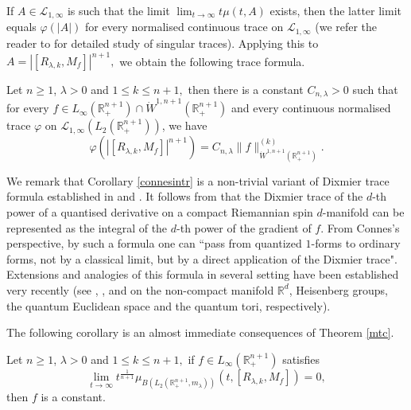 \documentclass[12pt]{amsart}
\begin{document}
If $A\in\mathcal{L}_{1,\infty}$ is such that the limit $\lim_{t\to\infty}t\mu(t,A)$ exists, then the latter limit equals $\varphi(|A|)$ for every normalised continuous trace on $\mathcal{L}_{1,\infty}$ (we refer the reader to \cite{LSZold,LSZ1} for detailed study of singular traces). Applying this to $A=|[R_{\lambda,k},M_f]|^{n+1},$ we obtain the following trace formula.
\begin{coro}\label{connesintr}
Let $n\geq1$, $\lambda>0$ and $1\leq k\leq n+1,$ then there is a constant $C_{n,\lambda}>0$ such that for every $f\in L_{\infty}(\mathbb{R}^{n+1}_+)\cap\dot{W}^{1,n+1}(\mathbb{R}^{n+1}_+)$ and every continuous normalised trace $\varphi$ on $\mathcal{L}_{1,\infty}(L_2(\mathbb{R}^{n+1}_+))$, we have
$$\varphi(|[R_{\lambda,k},M_f]|^{n+1})=C_{n,\lambda}\|f\|_{\dot{W}^{1,n+1}(\mathbb{R}_+^{n+1})}^{(k)}.$$
\end{coro}
We remark that Corollary \ref{connesintr} is a non-trivial variant of Dixmier trace formula established in \cite[Theorem 2]{LMSZ} and \cite[Theorem 3 (iii)]{Connes1998}. It follows from  \cite[Theorem 3 (iii)]{Connes1998} that the Dixmier trace of the $d$-th power of a quantised derivative on a compact Riemannian spin $d$-manifold can be represented as the integral of the $d$-th power of the gradient of $f$. From Connes's perspective, by such a formula one can ``pass from quantized $1$-forms to ordinary forms, not by a classical limit, but by a direct application of the Dixmier trace". Extensions and analogies of this formula \cite[Theorem 3 (iii)]{Connes1998} in several setting have been established very recently (see \cite{LMSZ}, \cite{MR4654013}, \cite{MSX2019} and \cite{MSX2018} on the non-compact manifold $\mathbb{R}^d$, Heisenberg groups, the quantum Euclidean space and the quantum tori, respectively).



The following corollary is an almost immediate consequences of Theorem \ref{mtc}.
\begin{coro}
Let $n\geq1$, $\lambda>0$ and $1\leq k\leq n+1,$ if $f\in L_\infty(\mathbb{R}_+^{n+1})$ satisfies
$$\lim_{t\to\infty}t^{\frac1{n+1}}\mu_{B(L_2(\mathbb{R}^{n+1}_+,m_{\lambda}))}(t,[R_{\lambda,k},M_f])=0,$$
then $f$ is a constant.
\end{coro}
%
%
\end{document}
